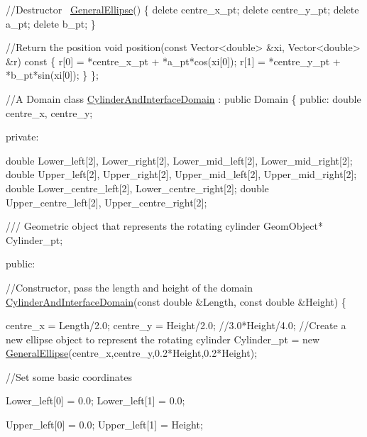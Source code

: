 \begin{DoxyCodeInclude}
 \textcolor{comment}{//Destructor}
 ~\hyperlink{classGeneralEllipse}{GeneralEllipse}()
  \{
   \textcolor{keyword}{delete} centre\_x\_pt;
   \textcolor{keyword}{delete} centre\_y\_pt;
   \textcolor{keyword}{delete} a\_pt;
   \textcolor{keyword}{delete} b\_pt;
  \}

 \textcolor{comment}{//Return the position}
 \textcolor{keywordtype}{void} position(\textcolor{keyword}{const} Vector<double> &xi, Vector<double> &r)\textcolor{keyword}{ const}
\textcolor{keyword}{  }\{
   r[0] = *centre\_x\_pt + *a\_pt*cos(xi[0]);
   r[1] = *centre\_y\_pt + *b\_pt*sin(xi[0]);
  \}
\};


\textcolor{comment}{//A Domain}
\textcolor{keyword}{class }\hyperlink{classCylinderAndInterfaceDomain}{CylinderAndInterfaceDomain} : \textcolor{keyword}{public} Domain
\{
\textcolor{keyword}{public}:
 \textcolor{keywordtype}{double} centre\_x, centre\_y;

\textcolor{keyword}{private}:
 
 \textcolor{keywordtype}{double} Lower\_left[2], Lower\_right[2], Lower\_mid\_left[2], Lower\_mid\_right[2];
 \textcolor{keywordtype}{double} Upper\_left[2], Upper\_right[2], Upper\_mid\_left[2], Upper\_mid\_right[2];
 \textcolor{keywordtype}{double} Lower\_centre\_left[2], Lower\_centre\_right[2];
 \textcolor{keywordtype}{double} Upper\_centre\_left[2], Upper\_centre\_right[2];

\textcolor{comment}{}
\textcolor{comment}{ /// Geometric object that represents the rotating cylinder}
\textcolor{comment}{} GeomObject* Cylinder\_pt;

\textcolor{keyword}{public}:

 \textcolor{comment}{//Constructor, pass the length and height of the domain}
 \hyperlink{classCylinderAndInterfaceDomain}{CylinderAndInterfaceDomain}(\textcolor{keyword}{const} \textcolor{keywordtype}{double} &Length, \textcolor{keyword}{const} \textcolor{keywordtype}{double} &Height)
  \{   

   centre\_x = Length/2.0;
   centre\_y = Height/2.0; \textcolor{comment}{//3.0*Height/4.0;}
  \textcolor{comment}{//Create a new ellipse object to represent the rotating cylinder}
   Cylinder\_pt = \textcolor{keyword}{new} \hyperlink{classGeneralEllipse}{GeneralEllipse}(centre\_x,centre\_y,0.2*Height,0.2*Height);

   \textcolor{comment}{//Set some basic coordinates}

   Lower\_left[0] = 0.0;
   Lower\_left[1] = 0.0;
   
   Upper\_left[0] = 0.0;
   Upper\_left[1] = Height;


\end{DoxyCodeInclude}
